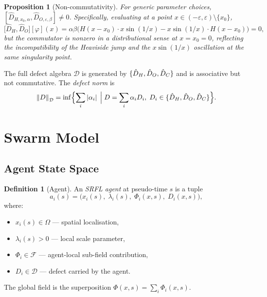 \documentclass[12pt,a4paper]{article}
\theoremstyle{plain}
\newtheorem{proposition}[theorem]{Proposition}
\theoremstyle{definition}
\newtheorem{definition}[theorem]{Definition}
\theoremstyle{remark}
\newcommand{\cF}{\mathcal{F}}
\newcommand{\cD}{\mathcal{D}}
\newcommand{\norm}[1]{\left\|#1\right\|}
\newcommand{\abs}[1]{\left|#1\right|}
\newcommand{\Dhat}[1]{\hat{D}_{#1}}
\newcommand{\eps}{\varepsilon}
\DeclarePairedDelimiter{\set}{\{}{\}}
\begin{document}
\begin{proposition}[Non-commutativity]
  For generic parameter choices,
  $[\Dhat{H,x_0,\alpha}, \Dhat{O,\eps,\beta}] \neq 0$.
  Specifically, evaluating at a point $x \in (-\eps, \eps) \setminus \{x_0\}$,
  \begin{equation}
    \bigl[\Dhat{H}, \Dhat{O}\bigr][\varphi](x)
    = \alpha\beta\bigl(H(x-x_0)\cdot x\sin(1/x) - x\sin(1/x)\cdot H(x-x_0)\bigr)
    = 0,
  \end{equation}
  but the commutator is nonzero in a distributional sense at $x = x_0 = 0$,
  reflecting the incompatibility of the Heaviside jump and the
  $x\sin(1/x)$ oscillation at the same singularity point.
\end{proposition}

The full defect algebra $\cD$ is generated by
$\set{\Dhat{H}, \Dhat{O}, \Dhat{C}}$ and is associative but not
commutative.  The \emph{defect norm} is
\begin{equation}
  \norm{D}_\cD
  = \inf\set[\Big]{\sum_{i}\abs{\alpha_i}
    \;\Big|\; D = \sum_i \alpha_i D_i,\; D_i \in \set{\Dhat{H},\Dhat{O},\Dhat{C}}}.
  \label{eq:defect_norm}
\end{equation}

\section{Swarm Model}
\label{sec:swarm}

\subsection{Agent State Space}

\begin{definition}[Agent]
  An \emph{SRFL agent} at pseudo-time $s$ is a tuple
  \begin{equation}
    a_i(s) = \bigl(x_i(s),\;\lambda_i(s),\;\Phi_i(x,s),\;D_i(x,s)\bigr),
    \label{eq:agent_state}
  \end{equation}
  where:
  \begin{itemize}
    \item $x_i(s) \in \Omega$ — spatial localisation,
    \item $\lambda_i(s) > 0$ — local scale parameter,
    \item $\Phi_i \in \cF$ — agent-local sub-field contribution,
    \item $D_i \in \cD$ — defect carried by the agent.
  \end{itemize}
  The global field is the superposition
  $\Phi(x,s) = \sum_i \Phi_i(x,s)$.
\end{definition}
\end{document}
